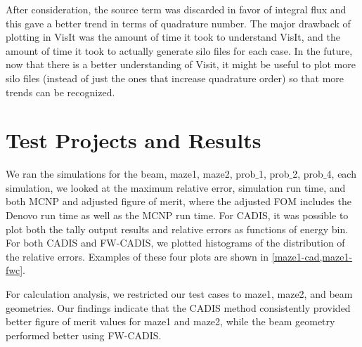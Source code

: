 \documentclass[10pt]{article}
\begin{document}
After consideration, the source term was discarded in favor of integral flux and this gave a better trend in terms of quadrature number.
The major drawback of plotting in VisIt was the amount of time it took to understand VisIt, and the amount of time it took to actually generate silo files for each case.
In the future, now that there is a better understanding of Visit, it might be useful to plot more silo files (instead of just the ones that increase quadrature order) so that more trends can be recognized.

\newpage

\section{Test Projects and Results}
\label{sec:test}

We ran the simulations for the beam, maze1, maze2, prob$\_$1, prob$\_$2, prob$\_$4, each simulation, we looked at the maximum relative error, simulation run time, and both MCNP and adjusted figure of merit, where the adjusted FOM includes the Denovo run time as well as the MCNP run time.
For CADIS, it was possible to plot both the tally output results and relative errors as functions of energy bin.
For both CADIS and FW-CADIS, we plotted histograms of the distribution of the relative errors.
Examples of these four plots are shown in \cref{maze1-cad,maze1-fwc}. 

For calculation analysis, we restricted our test cases to maze1, maze2, and beam geometries. Our findings indicate  that the CADIS method consistently provided better figure of merit values for maze1 and maze2, while the beam geometry performed better using FW-CADIS.
\end{document}
